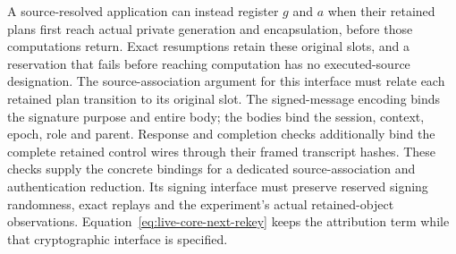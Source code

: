 A source-resolved application can instead register $g$ and $a$ when their
retained plans first reach actual private generation and encapsulation,
before those computations return. Exact resumptions retain these original
slots, and a reservation that fails before reaching computation has no
executed-source designation. The source-association argument for this
interface must relate each retained plan transition to its original slot.
The signed-message encoding binds the signature purpose and entire body;
the bodies bind the session, context, epoch, role and parent. Response and
completion checks additionally bind the complete retained control wires
through their framed transcript hashes. These checks supply the concrete
bindings for a dedicated source-association and authentication reduction.
Its signing
interface must preserve reserved signing randomness, exact replays and the
experiment's actual retained-object observations. Equation~\ref{eq:live-core-next-rekey}
keeps the attribution term while that cryptographic interface is specified.
